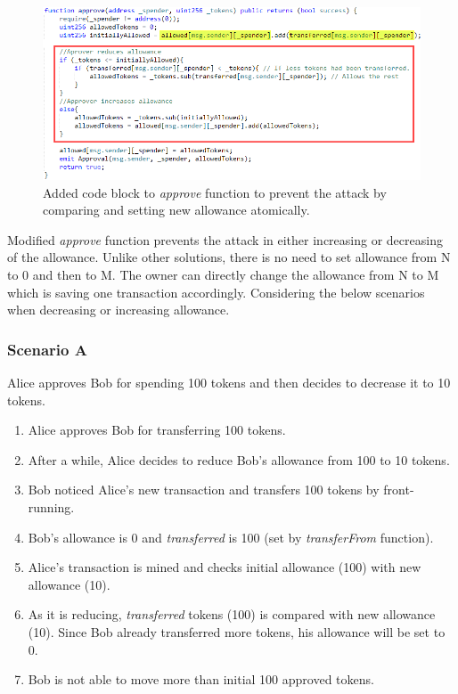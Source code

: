\begin{figure}[t]
	\centering
	\includegraphics[width=1.0\linewidth]{figures/multiple_withdrawal_15.png}
	\caption{Added code block to \textit{approve} function to prevent the attack by comparing and setting new allowance atomically.}
\end{figure}

Modified \textit{approve} function prevents the attack in either increasing or decreasing of the allowance. Unlike other solutions, there is no need to set allowance from N to 0 and then to M. The owner can directly change the allowance from N to M which is saving one transaction accordingly. Considering the below scenarios when decreasing or increasing allowance.

\subsubsection*{Scenario A} Alice approves Bob for spending 100 tokens and then decides to decrease it to 10 tokens.
\begin{enumerate}
	\item Alice approves Bob for transferring 100 tokens.
	\item After a while, Alice decides to reduce Bob’s allowance from 100 to 10 tokens.
	\item Bob noticed Alice’s new transaction and transfers 100 tokens by front-running.
	\item Bob’s allowance is 0 and \textit{transferred} is 100 (set by \textit{transferFrom} function).
	\item Alice’s transaction is mined and checks initial allowance (100) with new allowance (10).
	\item As it is reducing, \textit{transferred} tokens (100) is compared with new allowance (10). Since Bob already transferred more tokens, his allowance will be set to 0.
	\item Bob is not able to move more than initial 100 approved tokens.\newline
\end{enumerate}

